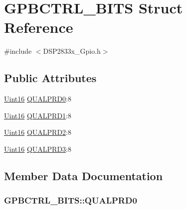 \hypertarget{struct_g_p_b_c_t_r_l___b_i_t_s}{}\section{G\+P\+B\+C\+T\+R\+L\+\_\+\+B\+I\+T\+S Struct Reference}
\label{struct_g_p_b_c_t_r_l___b_i_t_s}


{\ttfamily \#include $<$D\+S\+P2833x\+\_\+\+Gpio.\+h$>$}

\subsection*{Public Attributes}
\begin{DoxyCompactItemize}
\item 
\hyperlink{_d_s_p2833x___device_8h_a59a9f6be4562c327cbfb4f7e8e18f08b}{Uint16} \hyperlink{struct_g_p_b_c_t_r_l___b_i_t_s_a6e190edbc8689646dde55e5e7ec48bf6}{Q\+U\+A\+L\+P\+R\+D0}\+:8
\item 
\hyperlink{_d_s_p2833x___device_8h_a59a9f6be4562c327cbfb4f7e8e18f08b}{Uint16} \hyperlink{struct_g_p_b_c_t_r_l___b_i_t_s_a216f7b8ca8d9fa96d23741c4b9190ea2}{Q\+U\+A\+L\+P\+R\+D1}\+:8
\item 
\hyperlink{_d_s_p2833x___device_8h_a59a9f6be4562c327cbfb4f7e8e18f08b}{Uint16} \hyperlink{struct_g_p_b_c_t_r_l___b_i_t_s_a8b723bb2b411f273b3b59aa884e1eafb}{Q\+U\+A\+L\+P\+R\+D2}\+:8
\item 
\hyperlink{_d_s_p2833x___device_8h_a59a9f6be4562c327cbfb4f7e8e18f08b}{Uint16} \hyperlink{struct_g_p_b_c_t_r_l___b_i_t_s_afc42dd388f56ff09ad55f7ea03070168}{Q\+U\+A\+L\+P\+R\+D3}\+:8
\end{DoxyCompactItemize}


\subsection{Member Data Documentation}
\hypertarget{struct_g_p_b_c_t_r_l___b_i_t_s_a6e190edbc8689646dde55e5e7ec48bf6}{}
\subsubsection[{Q\+U\+A\+L\+P\+R\+D0}]{ G\+P\+B\+C\+T\+R\+L\+\_\+\+B\+I\+T\+S\+::\+Q\+U\+A\+L\+P\+R\+D0}\label{struct_g_p_b_c_t_r_l___b_i_t_s_a6e190edbc8689646dde55e5e7ec48bf6}
\hypertarget{struct_g_p_b_c_t_r_l___b_i_t_s_a216f7b8ca8d9fa96d23741c4b9190ea2}{}
